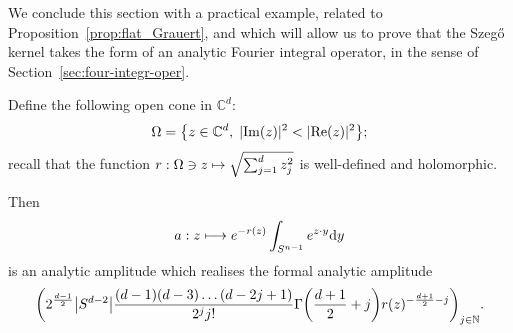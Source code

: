 \documentclass[AHL,Unicode,longabstracts,published]{cedram}
\DeclareMathOperator{\re}{Re}
\DeclareMathOperator{\im}{Im}
\newcommand\1{\mathds{1}}
\newcommand{\C}{\mathbb{C}}
\newcommand{\N}{\mathbb{N}}
\newcommand{\dd}{\mathrm{d}}
\let\oldmapsto\mapsto
\renewcommand*{\mapsto}{\mathchoice{\longmapsto}{\oldmapsto}{\oldmapsto}{\oldmapsto}}
\let\originalleft\left
\let\originalright\right
\renewcommand{\left}{\mathopen{}\mathclose\bgroup\originalleft}
\renewcommand{\right}{\aftergroup\egroup\originalright}
\begin{document}
We conclude this section with a practical example, related to Proposition~\ref{prop:flat_Grauert}, and which will allow us to prove that the Szeg\H{o} kernel takes the form of an analytic Fourier integral operator, in the sense of Section~\ref{sec:four-integr-oper}.

\begin{prop}\label{prop:m_n_amplitude}
Define the following open cone in $\C^d$:
\[
\Omega=\left\{z\in \C^d,\; \lvert\im(z)|^2<\lvert\re(z)|^2\right \};
\]
recall that the function $r:\Omega\ni z\mapsto
\sqrt{\sum_{j=1}^dz_j^2}$ is well-defined and holomorphic.

Then
\[
a:z\mapsto e^{-r(z)}\int_{S^{n-1}}e^{z\cdot y}\dd y
\]
is an analytic amplitude which realises the formal analytic amplitude
\[
\left(2^{\frac{d-1}{2}}\left|S^{d-2}\right|\frac{(d-1)(d-3)\dots (d-2j+1)}{2^jj!}\Gamma\left(\frac{d+1}{2}+j\right)r(z)^{-\frac{d+1}{2}-j}\right)_{j\in \N}.
\]
\end{prop}
\end{document}
